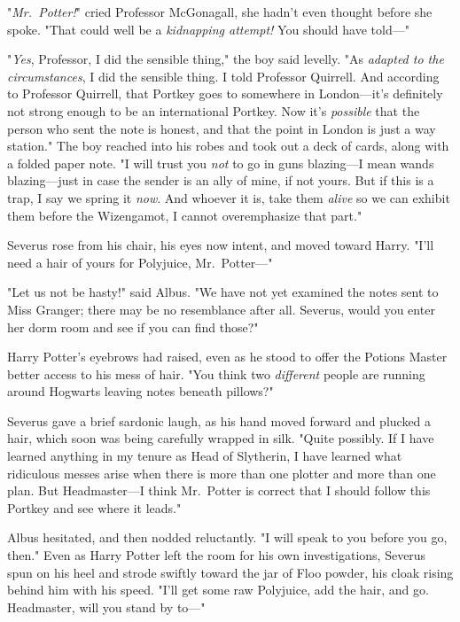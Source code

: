 "\emph{Mr.~Potter!}" cried Professor McGonagall, she hadn't even thought before
she spoke. "That could well be a \emph{kidnapping attempt!} You should have
told\mbox{---}"

"\emph{Yes}, Professor, I did the sensible thing," the boy said levelly. "As
\emph{adapted to the circumstances}, I did the sensible thing. I told Professor
Quirrell. And according to Professor Quirrell, that Portkey goes to somewhere
in London---it's definitely not strong enough to be an international Portkey.
Now it's \emph{possible} that the person who sent the note is honest, and that
the point in London is just a way station." The boy reached into his robes and
took out a deck of cards, along with a folded paper note. "I will trust you
\emph{not} to go in guns blazing---I mean wands blazing---just in case the
sender is an ally of mine, if not yours. But if this is a trap, I say we spring
it \emph{now}. And whoever it is, take them \emph{alive} so we can exhibit them
before the Wizengamot, I cannot overemphasize that part."

Severus rose from his chair, his eyes now intent, and moved toward Harry. "I'll
need a hair of yours for Polyjuice, Mr.~Potter\mbox{---}"

"Let us not be hasty!" said Albus. "We have not yet examined the notes sent to
Miss Granger; there may be no resemblance after all. Severus, would you enter
her dorm room and see if you can find those?"

Harry Potter's eyebrows had raised, even as he stood to offer the Potions
Master better access to his mess of hair. "You think two \emph{different}
people are running around Hogwarts leaving notes beneath pillows?"

Severus gave a brief sardonic laugh, as his hand moved forward and plucked a
hair, which soon was being carefully wrapped in silk. "Quite possibly. If I
have learned anything in my tenure as Head of Slytherin, I have learned what
ridiculous messes arise when there is more than one plotter and more than one
plan. But Headmaster---I think Mr.~Potter is correct that I should follow this
Portkey and see where it leads."

Albus hesitated, and then nodded reluctantly. "I will speak to you before you
go, then."
\sbreak
Even as Harry Potter left the room for his own investigations, Severus spun on
his heel and strode swiftly toward the jar of Floo powder, his cloak rising
behind him with his speed. "I'll get some raw Polyjuice, add the hair, and go.
Headmaster, will you stand by to\mbox{---}"

